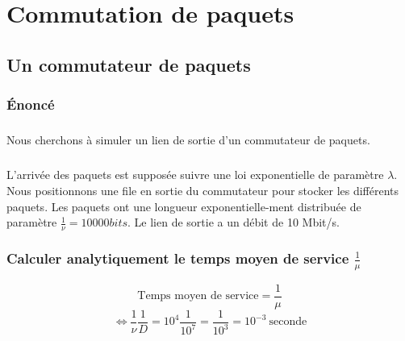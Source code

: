 %
\chapter{Commutation de paquets}
%
    \section{Un commutateur de paquets}
%
        \subsection{Énoncé}
%
            \paragraph{}
Nous cherchons à simuler un lien de sortie d'un commutateur de paquets.
%
            \paragraph{}
L'arrivée des paquets est supposée suivre une loi exponentielle de paramètre $\lambda$.
Nous positionnons une file en sortie du commutateur pour stocker les différents paquets.
Les paquets ont une longueur exponentielle-ment distribuée de paramètre $\frac{1}{\nu} = 10 000 bits$.
Le lien de sortie a un débit de 10 Mbit/s.
%
        \subsection{Calculer analytiquement le temps moyen de service $\frac{1}{\mu}$}
\[  \text{Temps moyen de service} = \frac{1}{\mu} \]
\[ \iff \frac{1}{\nu} \frac{1}{D} = 10^{4} \frac{1}{10^{7}} = \frac{1}{10^{3}} = 10^{-3} \ \text{seconde} \]
%
